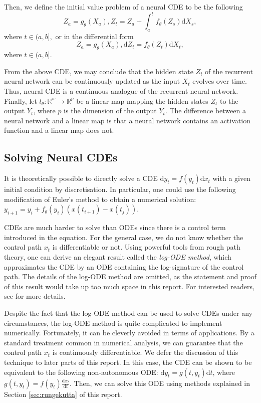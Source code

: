 \documentclass[a4paper,11pt,titlepage]{article}
\theoremstyle{definition}
\theoremstyle{plain}
\theoremstyle{remark}
\begin{document}
Then, we define the initial value problem of a neural CDE to be the following
$$Z_a=g_\theta(X_a), Z_t=Z_a+\int_a^tf_\theta(Z_s)\mathrm{d}X_s,$$ where $t\in(a,b],$
or in the differential form
$$Z_a=g_\theta(X_a), \mathrm{d}Z_t=f_\theta(Z_t)\mathrm{d}X_t,$$ where $t\in(a,b].$ \cite{kidger2022neural}

From the above CDE, we may conclude that the hidden state $Z_t$ of the recurrent neural network can be continuously updated as the input $X_t$ evolves over time. Thus, neural CDE is a continuous analogue of the recurrent neural network. Finally, let $l_\theta:\mathbb{R}^w\rightarrow\mathbb{R}^p$ be a linear map mapping the hidden states $Z_t$ to the output $Y_t$, where $p$ is the dimension of the output $Y_t$. The difference between a neural network and a linear map is that a neural network contains an activation function and a linear map does not.

\subsection{Solving Neural CDEs}

It is theoretically possible to directly solve a CDE $\mathrm{d}y_t = f(y_t)\mathrm{d}x_t$ with a given initial condition by discretisation. In particular, one could use the following modification of Euler's method to obtain a numerical solution: $y_{i+1}=y_i+f_\theta(y_i)(x(t_{i+1})-x(t_j))$.

CDEs are much harder to solve than ODEs since there is a control term introduced in the equation. For the general case, we do not know whether the control path $x_t$ is differentiable or not. Using powerful tools from rough path theory, one can derive an elegant result called the \textit{log-ODE method}, which approximates the CDE by an ODE containing the log-signature of the control path. \cite{morrill2021} The details of the log-ODE method are omitted, as the statement and proof of this result would take up too much space in this report. For interested readers, see \cite{morrill2021} for more details.

Despite the fact that the log-ODE method can be used to solve CDEs under any circumstances, the log-ODE method is quite complicated to implement numerically. Fortunately, it can be cleverly avoided in terms of applications. By a standard treatment common in numerical analysis, we can guarantee that the control path $x_t$ is continuously differentiable. We defer the discussion of this technique to later parts of this report. In this case, the CDE can be shown to be equivalent to the following non-autonomous ODE: $\mathrm{d}y_t=g(t,y_t)\mathrm{d}t$, where $g(t,y_t)=f(y_t)\frac{\mathrm{d}x_t}{\mathrm{d}t}$. Then, we can solve this ODE using methods explained in Section \ref{sec:rungekutta} of this report.
\end{document}
